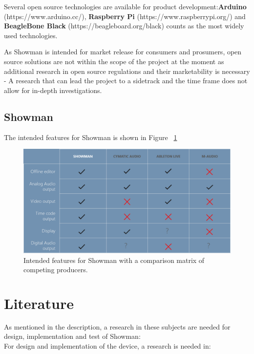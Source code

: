 Several open source technologies are available for product development:\textbf{Arduino} (https://www.arduino.cc/), \textbf{Raspberry Pi} (https://www.raspberrypi.org/) and \textbf{BeagleBone Black} (https://beagleboard.org/black) counts as the most widely used technologies. \newline

As Showman is intended for market release for consumers and prosumers, open source solutions are not within the scope of the project at the moment as additional research in open source regulations and their marketability is necessary - A research that can lead the project to a sidetrack and the time frame does not allow for in-depth investigations. \\

\subsection{Showman}
The intended features for Showman is shown in Figure ~\ref{fig:showman.png}

\begin{figure}[H]
\centering
\includegraphics[scale=0.5]{./pictures/showman.png}
\caption{Intended features for Showman with a comparison matrix of competing producers.}
\label{fig:showman.png}
\end{figure}

\section{Literature}
As mentioned in the description, a research in these subjects are needed for design, implementation and test of Showman: \\

For design and implementation of the device, a research is needed in: \\

